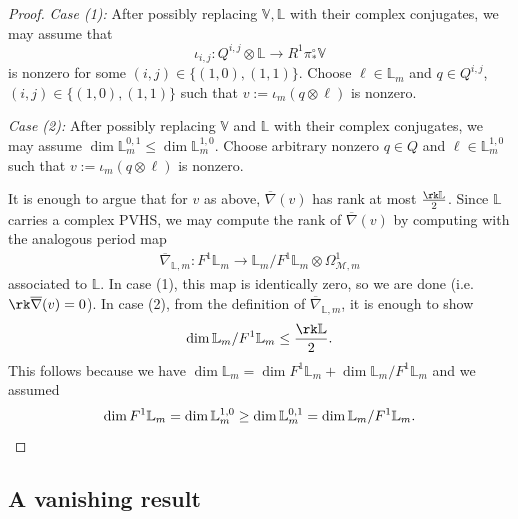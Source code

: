 \begin{proof}
\emph{Case (1):} After possibly replacing ${\mathbb{V}}, \mathbb{L}$ with their complex conjugates, we may assume that  $$\iota_{i,j}: Q^{i,j}\otimes\mathbb{L}\to R^1\pi_*^\circ \mathbb{V}$$ is nonzero for some $(i,j)\in \{(1,0), (1,1)\}$. Choose $\ell\in \mathbb{L}_m$ and $q\in Q^{i,j}$, $(i,j)\in\{(1,0), (1,1)\}$ such that $v:=\iota_m(q\otimes\ell)$ is nonzero.

\emph{Case (2):} After possibly replacing $\mathbb{V}$ and $\mathbb{L}$ with
their complex conjugates, we may assume $\dim\mathbb{L}_m^{0,1}\leq \dim \mathbb{L}_m^{1,0}$.
Choose arbitrary nonzero $q\in Q$ and $\ell\in \mathbb{L}_m^{1,0}$ such that $v:=\iota_m(q\otimes\ell)$ is nonzero.

It is enough to argue that for $v$ as above, $\overline{\nabla}(v)$ has rank at
most $\frac{\rk\mathbb{L}}{2}$. Since $\mathbb{L}$ carries a complex PVHS, we
may compute the rank of $\overline{\nabla}(v)$ by computing with the analogous
period map
\begin{align*}
\overline{\nabla}_{\mathbb L,m}: F^1\mathbb{L}_m\to \mathbb{L}_m/F^1\mathbb{L}_m\otimes \Omega^1_{\mathscr{M},m}
\end{align*}
associated to $\mathbb{L}$. In case (1), this map is identically
zero, so we are done (i.e.~$\rk \overline{\nabla}(v)=0$). In case (2),
from the definition of $\overline{\nabla}_{\mathbb L,m}$,
it
is enough to show
\begin{align*}
	\dim \mathbb{L}_m/F^1\mathbb{L}_m\leq \frac{\rk \mathbb L}{2}.
\end{align*}
This follows because we have
$\dim \mathbb{L}_m=\dim F^1 \mathbb{L}_m+ \dim \mathbb{L}_m/F^1 \mathbb L_m$ and
we assumed
\begin{equation*}
	\dim F^1 \mathbb L_m = \dim \mathbb L^{1,0}_m \geq \dim \mathbb
	L^{0,1}_m = \dim \mathbb L_m/F^1 \mathbb L_m.\qedhere
\end{equation*}
\end{proof}

\subsection{A vanishing result}
\label{subsection:no-sections}

